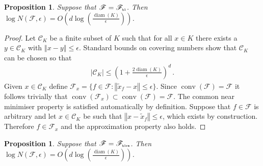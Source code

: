 \documentclass[letter, 12pt]{report}
\newcommand{\pr}{\text{\tiny\texttt{r}}}
\newcommand{\pb}{\text{\tiny\texttt{b}}}
\newcommand{\pl}{\text{\tiny\texttt{l}}}
\renewcommand{\pm}{\text{\tiny\texttt{m}}}
\newcommand{\norm}[1]{\left \Vert  #1 \right \Vert}
\newcommand{\cC}{\mathcal C}
\newcommand{\sF}{\mathscr F}
\newcommand{\conv}{\operatorname{conv}}
\newcommand{\diam}{\operatorname{diam}}
\newcommand{\1}{\mathbf{1}}
\theoremstyle{plain}
\newtheorem{proposition}[theorem]{Proposition}
\theoremstyle{definition}
\theoremstyle{remark}
\begin{document}
\begin{proposition}\label{prop:N}
    Suppose that $\sF = \sF_{\pb\pl}$. Then $\log N(\sF, \epsilon) = O\left(d \log\left(\frac{\diam(K)}{\epsilon}\right)\right)$.
\end{proposition}
\begin{proof}
    Let $\cC_K$ be a finite subset of $K$ such that for all $x \in K$ there exists a $y \in \cC_K$ with $\norm{x - y} \leq \epsilon$.
    Standard bounds on covering numbers \citep[\S4]{ASG15} show that $\cC_K$ can be chosen so that
    \begin{align*}
        |\cC_K| \leq \left(1 + \frac{2\diam(K)}{\epsilon}\right)^d \,.
    \end{align*}
    Given $x \in \cC_K$ define $\sF_x = \{f \in \sF : \norm{\tilde x_f - x} \leq \epsilon\}$.
    Since $\conv(\sF) = \sF$ it follows trivially that $\conv(\sF_x) \subset \conv(\sF) = \sF$.
    The common near minimiser property is satisfied automatically by definition.
    Suppose that $f \in \sF$ is arbitrary and let $x \in \cC_K$ be such that $\norm{x - \tilde x_f} \leq \epsilon$, which exists by construction.
    Therefore $f \in \sF_x$ and the approximation property also holds.
\end{proof}

\begin{proposition}\label{prop:N-ridge}
    Suppose that $\sF = \sF_{\pb\pl\pr\pm}$. Then $\log N(\sF, \epsilon) = O\left(d \log\left(\frac{\diam(K)}{\epsilon}\right)\right)$.
\end{proposition}
\end{document}
